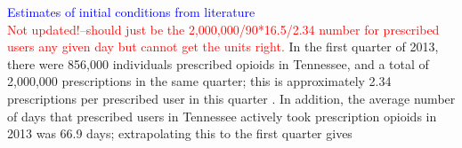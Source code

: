 \documentclass[12pt]{article}
\begin{document}
\textcolor{blue}{Estimates of initial conditions from literature} \\
\textcolor{red}{Not updated!--should just be the 2,000,000/90*16.5/2.34 number for prescribed users any given day but cannot get the units right.}
In the first quarter of 2013, there were 856,000 individuals prescribed opioids in Tennessee, and a total of 2,000,000 prescriptions in the same quarter; this is approximately 2.34 prescriptions per prescribed user in this quarter \cite{PDO}. In addition, the average number of days that prescribed users in Tennessee actively took prescription opioids in 2013 was 66.9 days; extrapolating this to the first quarter gives 
\end{document}
